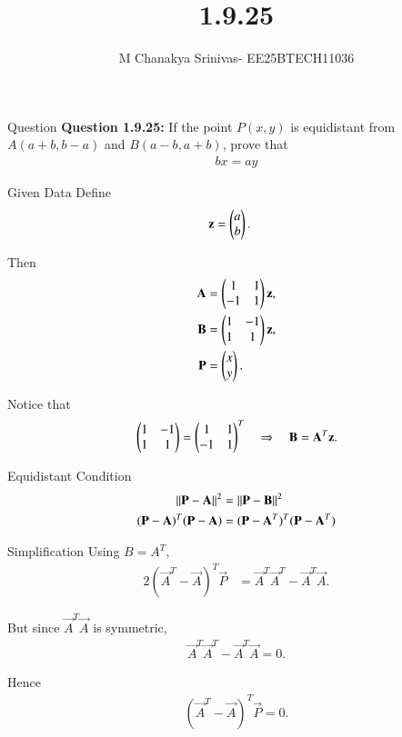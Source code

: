 \documentclass{beamer}
\title %
{1.9.25}
\date{}
\author %
{M Chanakya Srinivas- EE25BTECH11036}
\begin{document}
\frame{\titlepage}



\begin{frame}{Question}
\textbf{Question 1.9.25:}  
If the point $P(x,y)$ is equidistant from $A(a+b, b-a)$ and $B(a-b, a+b)$,  
prove that
\begin{align*}
    bx = ay
\end{align*}
\end{frame}

\begin{frame}{Given Data}
Define
\begin{align}
\mathbf{z} &= \begin{pmatrix}a \\ b\end{pmatrix}. 
\end{align}

Then
\begin{align}
\mathbf{A} &= \begin{pmatrix}1 & 1 \\ -1 & 1\end{pmatrix}\mathbf{z}, \\
\mathbf{B} &= \begin{pmatrix}1 & -1 \\ 1 & 1\end{pmatrix}\mathbf{z}, \\
\mathbf{P} &= \begin{pmatrix}x \\ y\end{pmatrix}.
\end{align}

Notice that
\begin{align}
\begin{pmatrix}1 & -1 \\ 1 & 1\end{pmatrix} 
= \begin{pmatrix}1 & 1 \\ -1 & 1\end{pmatrix}^T 
\quad \Rightarrow \quad \mathbf{B} = \mathbf{A}^T \mathbf{z}.
\end{align}
\end{frame}

\begin{frame}{Equidistant Condition}
\begin{align}
\left\lVert\mathbf{P}-\mathbf{A}\right\rVert^2 &= \left\lVert\mathbf{P}-\mathbf{B}\right\rVert^2 \\
(\mathbf{P}-\mathbf{A})^T(\mathbf{P}-\mathbf{A}) &= (\mathbf{P}-\mathbf{A}^T)^T(\mathbf{P}-\mathbf{A}^T)
\end{align}
\end{frame}

\begin{frame}{Simplification}
Using $B=A^T$,
\begin{align}
2(\vec{A}^T - \vec{A})^T \vec{P} &= \vec{A}^{T}\vec{A}^{T} - \vec{A}^T\vec{A}.
\end{align}

But since $\vec{A}^T\vec{A}$ is symmetric,  
\begin{align}
\vec{A}^{T}\vec{A}^{T} - \vec{A}^T\vec{A} = 0.
\end{align}

Hence
\begin{align}
(\vec{A}^T - \vec{A})^T \vec{P} = 0.
\end{align}
\end{frame}
\end{document}

